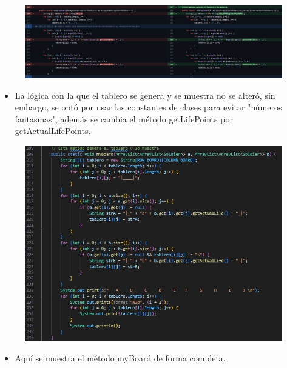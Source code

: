 \documentclass{article}
\begin{document}
	\begin{figure}[H]
		\centering
		\includegraphics[width=1\textwidth,keepaspectratio]{img/changesMyBoard.jpg}
	\end{figure}
	
	
	\begin{itemize}	
		\item La lógica con la que el tablero se genera y se muestra no se alteró, sin embargo, se optó por usar las constantes de clases para evitar "números fantasmas", además se cambia el método getLifePoints por getActualLifePoints.
	\end{itemize}
	
	\begin{figure}[H]
		\centering
		\includegraphics[width=1\textwidth,keepaspectratio]{img/myBoard.jpg}
	\end{figure}
	
	\begin{itemize}	
		\item Aquí se muestra el método myBoard de forma completa.
	\end{itemize}
		
\end{document}
